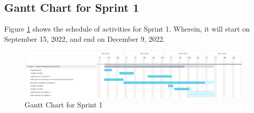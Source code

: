 \subsection{Gantt Chart for Sprint 1}
\label{subsec:gantt_chart_sprint1}
Figure \ref{fig:gantt_chart_sprint1} shows the schedule of activities for Sprint 1. 
Wherein, it will start on September 15, 2022, and end on December 9, 2022.
\begin{figure}[ht]
    \centering
    \includegraphics[width=1\textwidth]{./assets/Gantt_Chart_Sprint1.png}
    \caption{Gantt Chart for Sprint 1}
    \label{fig:gantt_chart_sprint1}
\end{figure}
\FloatBarrier